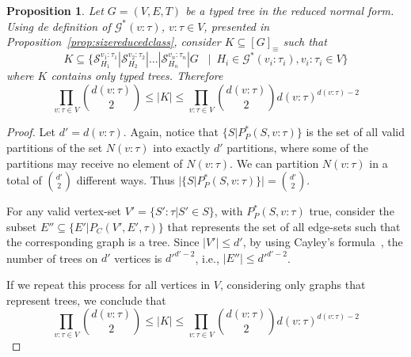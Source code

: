 \documentclass[preprint,12pt]{elsarticle}
\theoremstyle{plain}
\newtheorem{prop}[theorem]{Proposition}
\newcommand\tyv[2]{#1\!\!:\!\!#2}
\begin{document}
\begin{prop}\label{prop:sizereducedclass4trees}
Let $G = (V,E,T)$ be a typed tree in the reduced normal form.
Using de definition of $\mathcal{G}^*(\tyv{v}{\tau})$, $\tyv{v}{\tau}\in V$,
presented in Proposition~\ref{prop:sizereducedclass},
consider $K \subseteq [G]_\equiv$ such that
\[
K \subseteq \{ \mathcal{S}^{{v_1}:{\tau_1}}_{H_1}|\mathcal{S}^{{v_2}:{\tau_2}}_{H_2}|\dots|\mathcal{S}^{{v_n}:{\tau_n}}_{H_n}|G
             \,\,\,\,\,|\,\,\,   H_i\in\mathcal{G}^*(\tyv{v_i}{\tau_i}),\tyv{v_i}{\tau_i}\in V\}
\]
where $K$ contains only typed trees.
Therefore
\[
\prod_{v:\tau\in V} \binom{d(\tyv{v}{\tau})}{2} \leq |K| \leq \prod_{v:\tau\in V} \binom{d(\tyv{v}{\tau})}{2}d(v:\tau)^{d(v:\tau)-2}
\]
\end{prop}
\begin{proof}
Let $d' = d(\tyv{v}{\tau})$.
Again, notice that $\{S|P_P^*(S, \tyv{v}{\tau})\}$
is the set of all
valid partitions of the set $N(\tyv{v}{\tau})$
into exactly $d'$ partitions, where some of the partitions may receive no
element of $N(\tyv{v}{\tau})$. We can partition $N(\tyv{v}{\tau})$
in a total of $\binom{d'}{2}$ different ways. Thus $|\{S|P_P^*(S, \tyv{v}{\tau})\}| = \binom{d'}{2}$.

For any valid vertex-set $V'=\{\tyv{S'}{\tau}|S'\in S\}$, with $P_P^*(S, \tyv{v}{\tau})$ true,
consider the subset $E''\subseteq \{E'| P_C(V',E',\tau)\}$ that represents the set of all edge-sets such that the corresponding graph is a tree.
Since $|V'| \leq d'$, by using Cayley's formula~\cite{cayley1889}, 
the number of trees on $d'$ vertices is $d'^{d'-2}$, i.e., $|E''| \leq d'^{d'-2}$.

If we repeat this process for all vertices in $V$, considering only graphs that represent trees,
we conclude that
\[
\prod_{v:\tau\in V} \binom{d(\tyv{v}{\tau})}{2} \leq |K| \leq \prod_{v:\tau\in V} \binom{d(\tyv{v}{\tau})}{2}d(v:\tau)^{d(v:\tau)-2}
\]
\end{proof}

\end{document}
